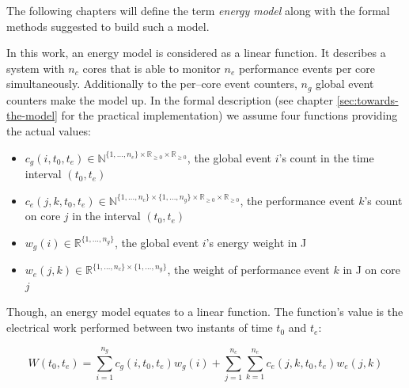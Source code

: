 \label{sec:model}

The following chapters will define the term \emph{energy model} along with  the
formal methods suggested to build such a model.


\label{sec:model-properties}

In this work, an energy model is considered as a linear function. It describes a
system with $n_c$ cores that is able to monitor $n_e$ performance events per
core simultaneously. Additionally to the per--core event counters,
$n_g$ global event counters make the model up. In the formal description (see
chapter \ref{sec:towards-the-model} for the practical implementation) we assume
four functions providing the actual values:

\begin{itemize}

\item $c_g(i, t_0, t_e) \in \mathbb{N}^{\{1, \ldots, n_e\} \times
\mathbb{R}_{\geq 0} \times \mathbb{R}_{\geq 0}}$, the global event $i$'s count
in the time interval $(t_0, t_e)$

\item $c_e(j, k, t_0, t_e) \in \mathbb{N}^{\{1, \ldots, n_c\} \times
\{1, \ldots, n_g\} \times \mathbb{R}_{\geq 0} \times \mathbb{R}_{\geq 0}}$, the
performance event $k$'s count on core $j$ in the interval $(t_0, t_e)$

\item $w_g(i) \in \mathbb{R}^{\{1, \ldots, n_g\}}$, the global event $i$'s
energy weight in \si{\joule}

\item $w_e(j, k) \in \mathbb{R}^{\{1, \ldots, n_c\} \times \{1, \ldots, n_g\}}$,
the weight of performance event $k$ in \si{\joule} on core $j$

\end{itemize}

Though, an energy model equates to a linear function. The function's value is
the electrical work performed between two instants of time $t_0$ and $t_e$:

\begin{equation}
W(t_0, t_e) = \sum\limits_{i=1}^{n_g} c_g(i, t_0, t_e) w_g(i) +
\sum\limits_{j=1}^{n_c} \sum\limits_{k=1}^{n_e} c_e(j, k, t_0, t_e) w_e(j, k)
\end{equation}

